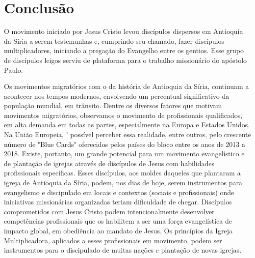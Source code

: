 \documentclass[12pt,openright,oneside,a4paper,
english,french,spanish,brazil]{abntex2}
\begin{document}
\chapter*{Conclusão}

O movimento iniciado por Jesus Cristo levou discípulos dispersos em Antioquia da Síria a serem testemunhas e, cumprindo seu chamado, fazer discípulos multiplicadores, iniciando a pregação do Evangelho entre os gentios. Esse grupo de discípulos leigos serviu de plataforma para o trabalho missionário do apóstolo Paulo. 

Os movimentos migratórios com o da história de Antioquia da Síria, continuam a acontecer nos tempos modernos, envolvendo um percentual significativo da população mundial, em trânsito. Dentre os diversos fatores que motivam movimentos migratórios, observamos o movimento de profissionais qualificados, em alta demanda em todas as partes, especialmente na Europa e Estados Unidos. Na União Europeia, ' possível perceber essa realidade, entre outros, pelo crescente número de "Blue Cards" oferecidos pelos países do bloco entre os anos de 2013 a 2018. Existe, portanto, um grande potencial para um movimento evangelístico e de plantação de igrejas através de discípulos de Jesus com habilidades profissionais específicas. Esses discípulos, aos moldes daqueles que plantaram a igreja de Antioquia da Síria, podem, nos dias de hoje, serem instrumentos para evangelismo e discipulado em locais e contextos (sociais e profissionais) onde iniciativas missionárias organizadas teriam dificuldade de chegar. Discípulos comprometidos com Jesus Cristo podem intencionalmente desenvolver competências profissionais que os habilitem a ser uma força evangelística de impacto global, em obediência ao mandato de Jesus. Os princípios da Igreja Multiplicadora, aplicados a esses profissionais em movimento, podem ser instrumentos para o discipulado de muitas nações e plantação de novas igrejas.



\end{document}
